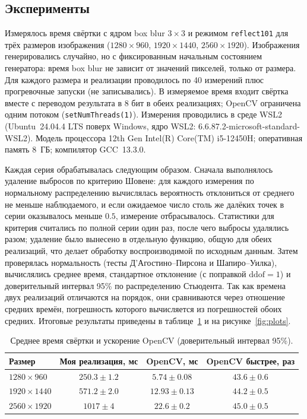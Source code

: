 \documentclass[a4paper]{article}
\begin{document}
\subsection{Эксперименты}

Измерялось время свёртки с ядром box blur $3\times3$ и режимом \texttt{reflect101} для трёх размеров изображения ($1280\times960$, $1920\times1440$, $2560\times1920$). Изображения генерировались случайно, но с фиксированным начальным состоянием генератора: время box blur не зависит от значений пикселей, только от размера. Для каждого размера и реализации проводилось по 40 измерений плюс прогревочные запуски (не записывались). В измеряемое время входит свёртка вместе с переводом результата в 8 бит в обеих реализациях; OpenCV ограничена одним потоком (\texttt{setNumThreads(1)}). Измерения проводились в среде WSL2 (Ubuntu~24.04.4 LTS поверх Windows, ядро WSL2: 6.6.87.2-microsoft-standard-WSL2). Модель процессора 12th Gen Intel(R) Core(TM) i5-12450H; оперативная память 8~ГБ; компилятор GCC~13.3.0.


Каждая серия обрабатывалась следующим образом. Сначала выполнялось удаление выбросов по критерию Шовене: для каждого измерения по нормальному распределению вычислялась вероятность отклониться от среднего не меньше наблюдаемого, и если ожидаемое число столь же далёких точек в серии оказывалось меньше $0.5$, измерение отбрасывалось. Статистики для критерия считались по полной серии один раз, после чего выбросы удалялись разом; удаление было вынесено в отдельную функцию, общую для обеих реализаций, что делает обработку воспроизводимой по исходным данным. Затем проверялась нормальность (тесты Д'Агостино--Пирсона и Шапиро--Уилка), вычислялись среднее время, стандартное отклонение (с поправкой $\mathrm{ddof}=1$) и доверительный интервал 95\% по распределению Стьюдента. Так как времена двух реализаций отличаются на порядок, они сравниваются через отношение средних времён, погрешность которого вычисляется из погрешностей обоих средних. Итоговые результаты приведены в таблице~\ref{tab:results} и на рисунке~\ref{fig:plots}.

\begin{table}[ht]
    \centering
    \caption{Среднее время свёртки и ускорение OpenCV (доверительный интервал 95\%).}
    \label{tab:results}
    \begin{tabular}{lccc}
        \hline
        Размер & Моя реализация, мс & OpenCV, мс & OpenCV быстрее, раз \\
        \hline
        $1280\times960$  & $250.3 \pm 1.2$ & $5.74 \pm 0.08$  & $43.6 \pm 0.6$ \\
        $1920\times1440$ & $571.2 \pm 2.0$ & $12.93 \pm 0.13$ & $44.2 \pm 0.5$ \\
        $2560\times1920$ & $1017 \pm 4$    & $22.6 \pm 0.2$   & $45.0 \pm 0.5$ \\
        \hline
    \end{tabular}
\end{table}
\end{document}
